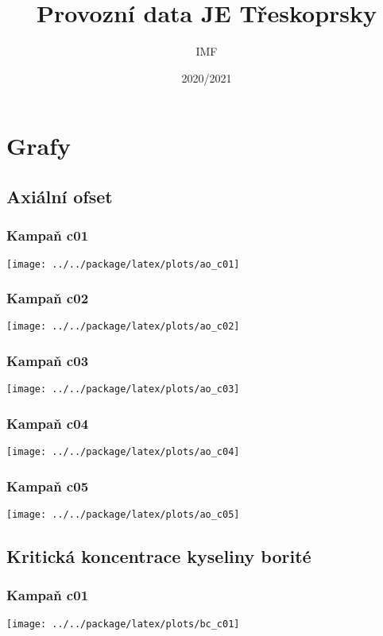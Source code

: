 \documentclass[a4paper,twoside,11pt]{article}
\title{Provozní data JE Třeskoprsky}
\author{IMF}
\date{2020/2021}
\begin{document}
\maketitle
\tableofcontents

\section{Grafy}


\subsection{Axiální ofset}

\subsubsection{Kampaň c01}
\texttt{[image: ../../package/latex/plots/ao\_c01]}

\subsubsection{Kampaň c02}
\texttt{[image: ../../package/latex/plots/ao\_c02]}

\subsubsection{Kampaň c03}
\texttt{[image: ../../package/latex/plots/ao\_c03]}

\subsubsection{Kampaň c04}
\texttt{[image: ../../package/latex/plots/ao\_c04]}

\subsubsection{Kampaň c05}
\texttt{[image: ../../package/latex/plots/ao\_c05]}


\subsection{Kritická koncentrace kyseliny borité}

\subsubsection{Kampaň c01}
\texttt{[image: ../../package/latex/plots/bc\_c01]}
\end{document}
